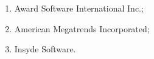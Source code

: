 \begin{enumerate}
\item Award Software International Inc.;
\item American Megatrends Incorporated;
\item Insyde Software.
\end{enumerate}
